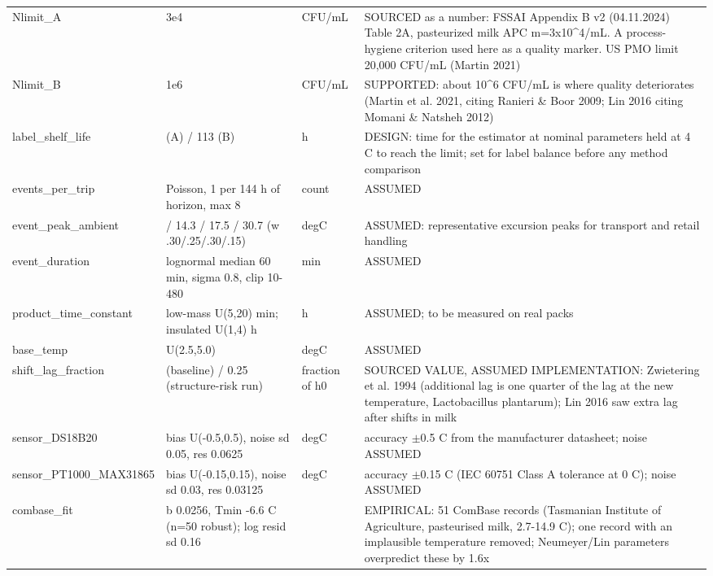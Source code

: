 {{\begin{longtable}{@{}>{\raggedright\arraybackslash}p{2.7cm}>{\raggedright\arraybackslash}p{2.9cm}>{\raggedright\arraybackslash}p{1.6cm}>{\raggedright\arraybackslash}p{6.6cm}@{}}
Nlimit\_\allowbreak{}A & 3e4 & CFU/mL & SOURCED as a number: FSSAI Appendix B v2 (04.11.2024) Table 2A, pasteurized milk APC m=3x10\^{}4/mL. A process-hygiene criterion used here as a quality marker. US PMO limit 20,000 CFU/mL (Martin 2021)\\
Nlimit\_\allowbreak{}B & 1e6 & CFU/mL & SUPPORTED: about 10\^{}6 CFU/mL is where quality deteriorates (Martin et al. 2021, citing Ranieri \& Boor 2009; Lin 2016 citing Momani \& Natsheh 2012)\\
label\_\allowbreak{}shelf\_\allowbreak{}life & 83 (A) / 113 (B) & h & DESIGN: time for the estimator at nominal parameters held at 4 C to reach the limit; set for label balance before any method comparison\\
events\_\allowbreak{}per\_\allowbreak{}trip & Poisson, 1 per 144 h of horizon, max 8 & count & ASSUMED\\
event\_\allowbreak{}peak\_\allowbreak{}ambient & 12 / 14.3 / 17.5 / 30.7 (w .30/.25/.30/.15) & degC & ASSUMED: representative excursion peaks for transport and retail handling\\
event\_\allowbreak{}duration & lognormal median 60 min, sigma 0.8, clip 10-480 & min & ASSUMED\\
product\_\allowbreak{}time\_\allowbreak{}constant & low-mass U(5,20) min; insulated U(1,4) h & h & ASSUMED; to be measured on real packs\\
base\_\allowbreak{}temp & U(2.5,5.0) & degC & ASSUMED\\
shift\_\allowbreak{}lag\_\allowbreak{}fraction & 0 (baseline) / 0.25 (structure-risk run) & fraction of h0 & SOURCED VALUE, ASSUMED IMPLEMENTATION: Zwietering et al. 1994 (additional lag is one quarter of the lag at the new temperature, Lactobacillus plantarum); Lin 2016 saw extra lag after shifts in milk\\
sensor\_\allowbreak{}DS18B20 & bias U(-0.5,0.5), noise sd 0.05, res 0.0625 & degC & accuracy $\pm$0.5 C from the manufacturer datasheet; noise ASSUMED\\
sensor\_\allowbreak{}PT1000\_\allowbreak{}MAX31865 & bias U(-0.15,0.15), noise sd 0.03, res 0.03125 & degC & accuracy $\pm$0.15 C (IEC 60751 Class A tolerance at 0 C); noise ASSUMED\\
combase\_\allowbreak{}fit & b 0.0256, Tmin -6.6 C (n=50 robust); log resid sd 0.16 &  & EMPIRICAL: 51 ComBase records (Tasmanian Institute of Agriculture, pasteurised milk, 2.7-14.9 C); one record with an implausible temperature removed; Neumeyer/Lin parameters overpredict these by 1.6x\\

\end{longtable}}}
